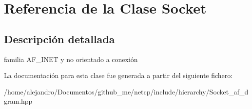 \hypertarget{classSocket}{}\section{Referencia de la Clase Socket}
\label{classSocket}


\subsection{Descripción detallada}
familia A\+F\+\_\+\+I\+N\+ET y no orientado a conexión 

La documentación para esta clase fue generada a partir del siguiente fichero\+:\begin{DoxyCompactItemize}
\item 
/home/alejandro/\+Documentos/github\+\_\+me/netcp/include/hierarchy/Socket\+\_\+af\+\_\+dgram.\+hpp\end{DoxyCompactItemize}
